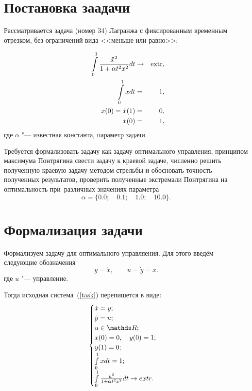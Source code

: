 \section{Постановка заадачи}

Рассматривается задача (номер 34) Лагранжа с фиксированным временным отрезком, без ограничений вида <<меньше или равно>>:

\begin{eqnarray}\label{task}
\int\limits_{0}^{1} \frac{\ddot{x}^2}{1 + \alpha t^2x^2} dt &\rightarrow& \operatorname{extr}, \\
\int\limits_{0}^{1} xdt &=&  1\notag,\\
\qquad x(0) = \dot{x}(1) &=&  0\notag,\\
\dot{x}(0) &=&  1\notag,
\end{eqnarray}
где $\alpha$ "--- известная константа, параметр задачи.

Требуется формализовать задачу как задачу оптимального управления, принципом максимума
Понтрягина свести задачу к краевой задаче, численно решить полученную краевую задачу методом стрельбы и обосновать точность полученных результатов, проверить полученные экстремали Понтрягина на оптимальность при~различных значениях параметра 
\[ \alpha = \{0.0;\quad 0.1; \quad 1.0; \quad 10.0\}.\]

\section{Формализация задачи}
Формализуем задачу для оптимального управляения. Для этого введём следующие обозначения
\[
y = \dot{x}, \qquad u = \dot{y} = \ddot{x}.
\]
где $u$ "--- управление. 

Тогда исходная система~(\ref{task}) перепишется в виде:
\begin{equation}\label{formtask}
	\begin{cases}
		\dot{x} = y;\\
		\dot{y} = u;\\
		u \in \R;\\
		x(0) = 0, \quad y(0) = 1;\\
		y(1) = 0;\\
		\int\limits_{0}^{1} xdt = 1;\\
		\int\limits_{0}^{1} \frac{u^2}{1 + \alpha t^2x^2} dt \to extr.\\
	\end{cases}
\end{equation}
